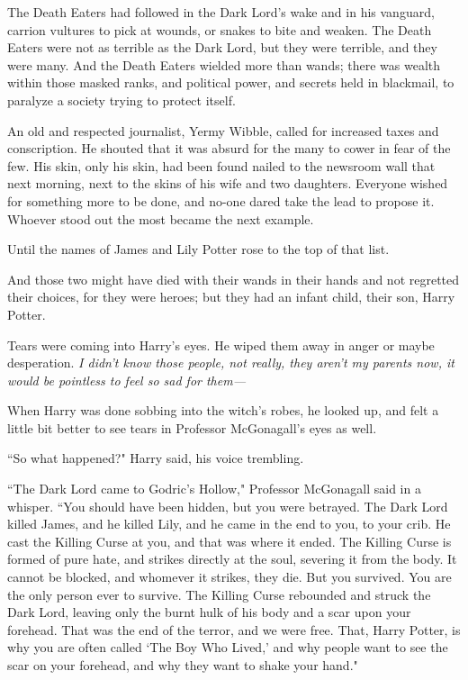 The Death Eaters had followed in the Dark Lord's wake and in his vanguard, carrion vultures to pick at wounds, or snakes to bite and weaken. The Death Eaters were not as terrible as the Dark Lord, but they were terrible, and they were many. And the Death Eaters wielded more than wands; there was wealth within those masked ranks, and political power, and secrets held in blackmail, to paralyze a society trying to protect itself.

An old and respected journalist, Yermy Wibble, called for increased taxes and conscription. He shouted that it was absurd for the many to cower in fear of the few. His skin, only his skin, had been found nailed to the newsroom wall that next morning, next to the skins of his wife and two daughters. Everyone wished for something more to be done, and no-one dared take the lead to propose it. Whoever stood out the most became the next example.

Until the names of James and Lily Potter rose to the top of that list.

And those two might have died with their wands in their hands and not regretted their choices, for they were heroes; but they had an infant child, their son, Harry Potter.

Tears were coming into Harry's eyes. He wiped them away in anger or maybe desperation. \emph{I didn't know those people, not really, they aren't my parents \emph{now}, it would be pointless to feel so sad for them—}

When Harry was done sobbing into the witch's robes, he looked up, and felt a little bit better to see tears in Professor McGonagall's eyes as well.

``So what happened?" Harry said, his voice trembling.

``The Dark Lord came to Godric's Hollow," Professor McGonagall said in a whisper. ``You should have been hidden, but you were betrayed. The Dark Lord killed James, and he killed Lily, and he came in the end to you, to your crib. He cast the Killing Curse at you, and that was where it ended. The Killing Curse is formed of pure hate, and strikes directly at the soul, severing it from the body. It cannot be blocked, and whomever it strikes, they die. But you survived. You are the only person ever to survive. The Killing Curse rebounded and struck the Dark Lord, leaving only the burnt hulk of his body and a scar upon your forehead. That was the end of the terror, and we were free. That, Harry Potter, is why you are often called `The Boy Who Lived,' and why people want to see the scar on your forehead, and why they want to shake your hand."

